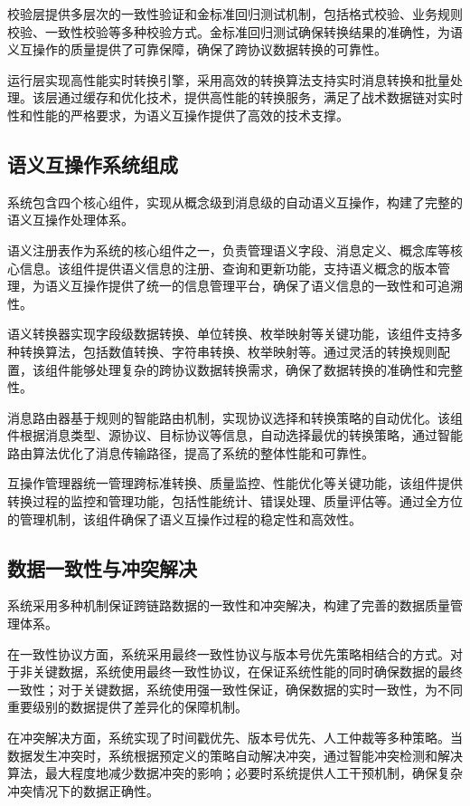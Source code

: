 校验层提供多层次的一致性验证和金标准回归测试机制，包括格式校验、业务规则校验、一致性校验等多种校验方式。金标准回归测试确保转换结果的准确性，为语义互操作的质量提供了可靠保障，确保了跨协议数据转换的可靠性。

运行层实现高性能实时转换引擎，采用高效的转换算法支持实时消息转换和批量处理。该层通过缓存和优化技术，提供高性能的转换服务，满足了战术数据链对实时性和性能的严格要求，为语义互操作提供了高效的技术支撑。

\subsection{语义互操作系统组成}

系统包含四个核心组件，实现从概念级到消息级的自动语义互操作，构建了完整的语义互操作处理体系。

语义注册表作为系统的核心组件之一，负责管理语义字段、消息定义、概念库等核心信息。该组件提供语义信息的注册、查询和更新功能，支持语义概念的版本管理，为语义互操作提供了统一的信息管理平台，确保了语义信息的一致性和可追溯性。

语义转换器实现字段级数据转换、单位转换、枚举映射等关键功能，该组件支持多种转换算法，包括数值转换、字符串转换、枚举映射等。通过灵活的转换规则配置，该组件能够处理复杂的跨协议数据转换需求，确保了数据转换的准确性和完整性。

消息路由器基于规则的智能路由机制，实现协议选择和转换策略的自动优化。该组件根据消息类型、源协议、目标协议等信息，自动选择最优的转换策略，通过智能路由算法优化了消息传输路径，提高了系统的整体性能和可靠性。

互操作管理器统一管理跨标准转换、质量监控、性能优化等关键功能，该组件提供转换过程的监控和管理功能，包括性能统计、错误处理、质量评估等。通过全方位的管理机制，该组件确保了语义互操作过程的稳定性和高效性。

\subsection{数据一致性与冲突解决}

系统采用多种机制保证跨链路数据的一致性和冲突解决，构建了完善的数据质量管理体系。

在一致性协议方面，系统采用最终一致性协议与版本号优先策略相结合的方式。对于非关键数据，系统使用最终一致性协议，在保证系统性能的同时确保数据的最终一致性；对于关键数据，系统使用强一致性保证，确保数据的实时一致性，为不同重要级别的数据提供了差异化的保障机制。

在冲突解决方面，系统实现了时间戳优先、版本号优先、人工仲裁等多种策略。当数据发生冲突时，系统根据预定义的策略自动解决冲突，通过智能冲突检测和解决算法，最大程度地减少数据冲突的影响；必要时系统提供人工干预机制，确保复杂冲突情况下的数据正确性。

